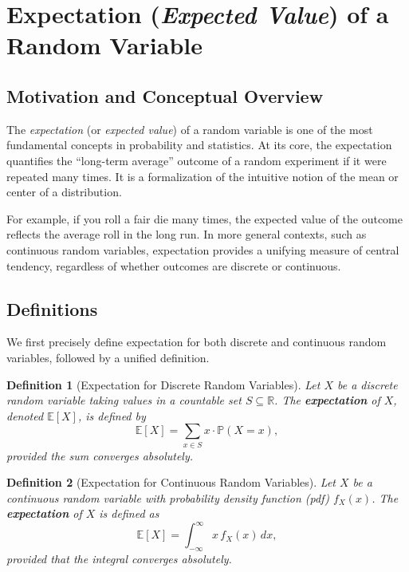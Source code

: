 \documentclass[12pt]{article}
\newtheorem{definition}{Definition}[section]
\begin{document}

\section{Expectation (\textit{Expected Value}) of a Random Variable}
\subsection{Motivation and Conceptual Overview}

The \emph{expectation} (or \emph{expected value}) of a random variable is one of the most fundamental concepts in probability and statistics. At its core, the expectation quantifies the ``long-term average'' outcome of a random experiment if it were repeated many times. It is a formalization of the intuitive notion of the mean or center of a distribution.

For example, if you roll a fair die many times, the expected value of the outcome reflects the average roll in the long run. In more general contexts, such as continuous random variables, expectation provides a unifying measure of central tendency, regardless of whether outcomes are discrete or continuous.

\subsection{Definitions}

We first precisely define expectation for both discrete and continuous random variables, followed by a unified definition.

\begin{definition}[Expectation for Discrete Random Variables]
    Let $X$ be a discrete random variable taking values in a countable set $S \subseteq \mathbb{R}$. The \textbf{expectation} of $X$, denoted $\mathbb{E}[X]$, is defined by
    \[
        \mathbb{E}[X] = \sum_{x \in S} x \cdot \mathbb{P}(X=x),
    \]
    provided the sum converges absolutely.
\end{definition}

\begin{definition}[Expectation for Continuous Random Variables]
    Let $X$ be a continuous random variable with probability density function (pdf) $f_X(x)$. The \textbf{expectation} of $X$ is defined as
    \[
        \mathbb{E}[X] = \int_{-\infty}^{\infty} x \, f_X(x) \, dx,
    \]
    provided that the integral converges absolutely.
\end{definition}
\end{document}
